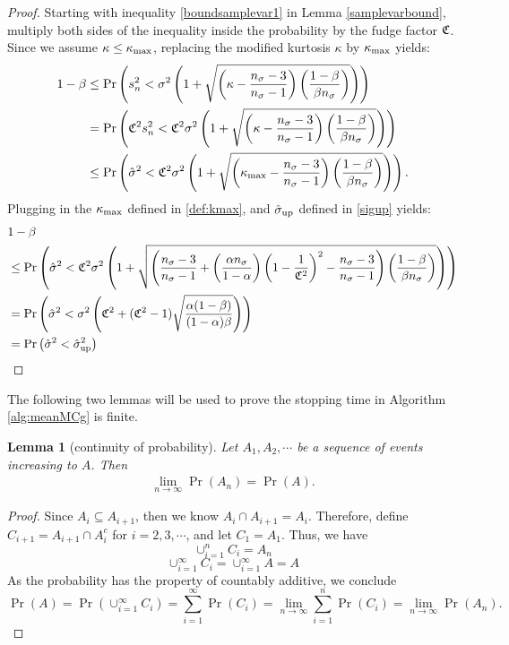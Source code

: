 \documentclass{iitthesis}
\newtheorem{lemma}[theorem]{Lemma}
\theoremstyle{definition}
\begin{document}
\begin{proof}
Starting with inequality \eqref{boundsamplevar1} in Lemma \ref{samplevarbound}, multiply both sides of the inequality inside the probability by the fudge factor $\mathfrak{C}$. Since we assume $\kappa \leq \kappa_{\max}$,  replacing the modified kurtosis $\kappa$ by $\kappa_{\max}$ yields:
\begin{align*}
1-\beta &\leq \Pr\left( s_n^2 < \sigma^2 \left (1+\sqrt{\left (\kappa-\frac{n_{\sigma}-3}{n_{\sigma}-1}\right)\left (\frac{1-\beta}{\beta n_{\sigma}}\right )}\right)\right)\\&
 = \Pr\left( \mathfrak{C}^2 s_n^2 < \mathfrak{C}^2 \sigma^2 \left (1+\sqrt{\left (\kappa-\frac{n_{\sigma}-3}{n_{\sigma}-1}\right)\left (\frac{1-\beta}{\beta n_{\sigma}}\right )}\right)\right)\\&
 \leq \Pr\left( \hat{\sigma}^2 < \mathfrak{C}^2 \sigma^2 \left (1+\sqrt{\left (\kappa_{\max}-\frac{n_{\sigma}-3}{n_{\sigma}-1}\right)\left (\frac{1-\beta}{\beta n_{\sigma}}\right )}\right)\right).
 \end{align*}
Plugging in the $\kappa_{\max}$ defined in \eqref{def:kmax}, and $\hat{\sigma}_{\operatorname{up}}$ defined in \eqref{sigup} yields:
\begin{align*}
&1-\beta \\
&\leq \Pr\left( \hat{\sigma}^2 < \mathfrak{C}^2 \sigma^2 \left (1+\sqrt{\left (\frac{n_{\sigma}-3}{n_{\sigma}-1} + \left(\frac{ \alpha n_{\sigma}}{1-\alpha}\right) \left(1 - \frac{1}{\mathfrak{C}^2}\right)^2- \frac{n_{\sigma}-3}{n_{\sigma}-1}\right)\left (\frac{1-\beta}{\beta n_{\sigma}}\right )}\right)\right)\\
& = \Pr\left( \hat{\sigma}^2 < \sigma^2 \left(\mathfrak{C}^2+(\mathfrak{C}^2-1)\sqrt{\frac{\alpha(1-\beta)}{(1-\alpha)\beta}}\right)\right)\\
& =\Pr \left ( \hat{\sigma}^2< \hat{\sigma}_{\operatorname{up}}^2 \right)
\end{align*}
\end{proof}
The following two lemmas will be used to prove the stopping time in Algorithm \ref{alg:meanMCg} is finite.
\begin{lemma}[continuity of probability]\label{contiofprob}
Let $A_1, A_2, \cdots$ be a sequence of events increasing to $A$. Then
\begin{align}
\lim_{n \to \infty}\Pr(A_n) =\Pr(A).
\end{align}
\end{lemma}
\begin{proof}
Since $A_i \subseteq A_{i+1}$, then we know $A_i \cap A_{i+1} = A_i$. Therefore, define $C_{i+1} = A_{i+1} \cap A_i^c$ for $i = 2,3,\cdots$, and let $C_1 = A_1$. Thus, we have
$$\cup_{i=1}^n C_i = A_n$$
$$\cup_{i=1}^\infty C_i=\cup_{i=1}^\infty A=A$$
As the probability has the property of countably additive, we conclude
$$\Pr (A) = \Pr (\cup_{i=1}^\infty C_i) = \sum_{i=1}^\infty \Pr(C_i) =  \lim_{n \to \infty}\sum_{i=1}^n\Pr(C_i)=\lim_{n\to \infty}\Pr(A_n).$$
\end{proof}
\end{document}
